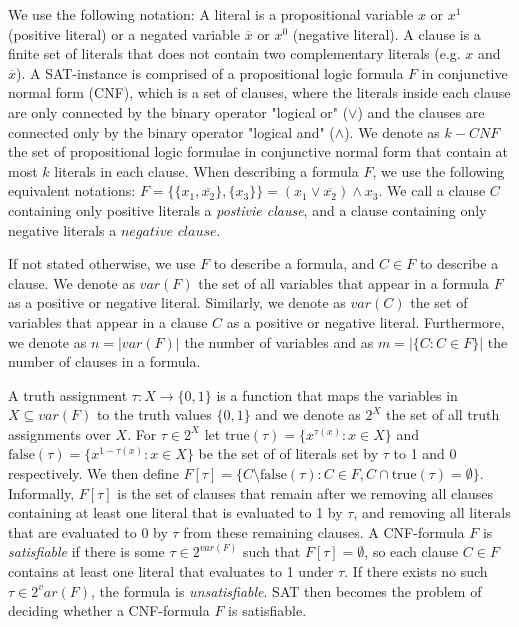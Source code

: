 \documentclass[11pt,a4paper]{article}
\theoremstyle{definition}
\theoremstyle{proposition}
\begin{document}
We use the following notation: A literal is a propositional variable $x$ or $x^1$ (positive literal) or a negated variable $\overline{x}$ or $x^0$ (negative literal). A clause is a finite set of literals that does not contain two complementary literals (e.g. $x$ and $\overline{x}$). A SAT-instance is comprised of a propositional logic formula $F$ in conjunctive normal form (CNF), which is a set of clauses, where the literals inside each clause are only connected by the binary operator "logical or" ($\lor$) and the clauses are connected only by the binary operator "logical and" ($\land$). We denote as $k-CNF$ the set of propositional logic formulae in conjunctive normal form that contain at most $k$ literals in each clause. When describing a formula $F$, we use the following equivalent notations: $F = \{ \{x_1, \overline{x_2}\}, \{x_3\} \} = (x_1 \lor \overline{x_2}) \land x_3$. We call a clause $C$ containing only positive literals a \textit{postivie clause}, and a clause containing only negative literals a $\textit{negative clause}$. 

If not stated otherwise, we use $F$ to describe a formula, and $C \in F$ to describe a clause. We denote as $var(F)$ the set of all variables that appear in a formula $F$ as a positive or negative literal. Similarly, we denote as $var(C)$ the set of variables that appear in a clause $C$ as a positive or negative literal. Furthermore, we denote as $n = |var(F)|$ the number of variables and as $m = |\{C \colon C \in F \}|$ the number of clauses in a formula.  

A truth assignment $\tau: X \to \{0,1\}$ is a function that maps the variables in $X \subseteq var(F)$ to the truth values $\{0,1\}$ and we denote as $2^X$ the set of all truth assignments over $X$. For $\tau \in 2^X$ let $\text{true}(\tau) = \{x^{\tau(x)} \colon x \in X\}$ and $\text{false}(\tau) = \{x^{1-\tau(x)} \colon x \in X\}$ be the set of of literals set by $\tau$ to 1 and 0 respectively. We then define $F[\tau] = \{ C \setminus \text{false}(\tau) \colon C \in F, C \cap \text{true}(\tau) = \emptyset \}$. Informally, $F[\tau]$ is the set of clauses that remain after we removing all clauses containing at least one literal that is evaluated to 1 by $\tau$, and removing all literals that are evaluated to 0 by $\tau$ from these remaining clauses. A CNF-formula $F$ is \textit{satisfiable} if there is some $\tau \in 2^{var(F)}$ such that $F[\tau] = \emptyset$, so each clause $C \in F$ contains at least one literal that evaluates to 1 under $\tau$. If there exists no such $\tau \in 2^var(F)$, the formula is \textit{unsatisfiable}. SAT then becomes the problem of deciding whether a CNF-formula $F$ is satisfiable. 
\end{document}
